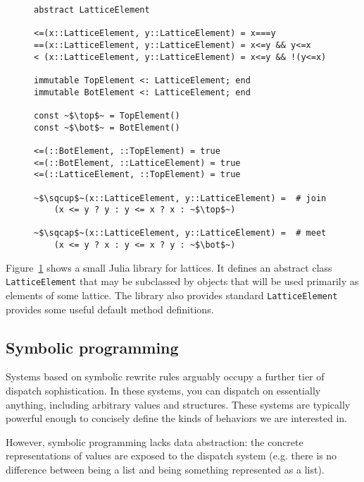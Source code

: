 \begin{figure}
  \label{julialattices}
  \begin{center}
\begin{singlespace}
\begin{lstlisting}[style=customjulia]
abstract LatticeElement

<=(x::LatticeElement, y::LatticeElement) = x===y
==(x::LatticeElement, y::LatticeElement) = x<=y && y<=x
< (x::LatticeElement, y::LatticeElement) = x<=y && !(y<=x)

immutable TopElement <: LatticeElement; end
immutable BotElement <: LatticeElement; end

const ~$\top$~ = TopElement()
const ~$\bot$~ = BotElement()

<=(::BotElement, ::TopElement) = true
<=(::BotElement, ::LatticeElement) = true
<=(::LatticeElement, ::TopElement) = true

~$\sqcup$~(x::LatticeElement, y::LatticeElement) =  # join
    (x <= y ? y : y <= x ? x : ~$\top$~)

~$\sqcap$~(x::LatticeElement, y::LatticeElement) =  # meet
    (x <= y ? x : y <= x ? y : ~$\bot$~)
\end{lstlisting}
\end{singlespace}
  \end{center}
\end{figure}

Figure~\ref{julialattices} shows a small Julia library for lattices.
It defines an abstract class \texttt{LatticeElement} that may be subclassed
by objects that will be used primarily as elements of some lattice.
The library also provides standard
\texttt{LatticeElement} provides some useful default method definitions.


\subsection{Symbolic programming}

Systems based on symbolic rewrite rules arguably occupy a further tier of
dispatch sophistication. In these systems, you can dispatch on essentially
anything, including arbitrary values and structures. These systems are
typically powerful enough to concisely define the kinds of behaviors we
are interested in.

However, symbolic programming lacks data abstraction: the concrete
representations of values are exposed to the dispatch system
(e.g. there is no difference between being a list and being something
represented as a list).

